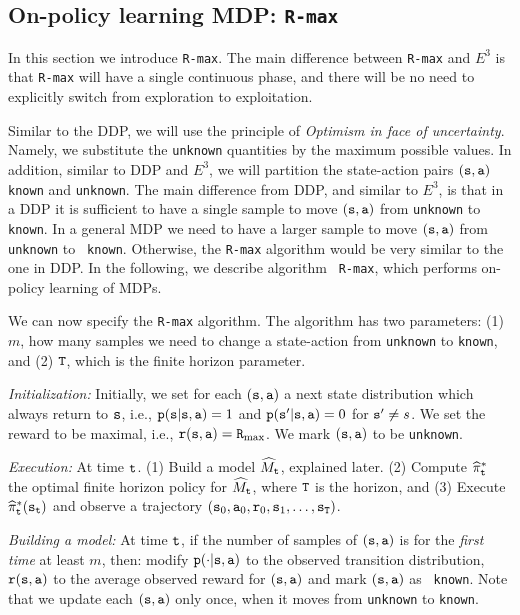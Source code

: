 \subsection{On-policy learning MDP: {\tt R-max}}

In this section we introduce {\tt R-max}. The main difference
between {\tt R-max} and $E^3$ is that {\tt R-max} will have a single
continuous phase, and there will be no need to explicitly switch
from exploration to exploitation.

Similar to the DDP, we will use the principle of {\em Optimism in
face of uncertainty}. Namely, we substitute the \texttt{unknown} quantities
by the maximum possible values.
%
In addition, similar to DDP and $E^3$, we will partition the
state-action pairs $({\tt s},{\tt a})$ \texttt{known} and \texttt{unknown}.
%
The main difference from DDP, and similar to $E^3$, is that in a DDP
it is sufficient to have a single sample to move $({\tt s},{\tt a})$
from \texttt{unknown} to \texttt{known}. In a general MDP we need to have a
larger sample to move $({\tt s},{\tt a})$ from \texttt{unknown} to {\tt
known}. Otherwise, the {\tt R-max} algorithm would be very similar
to the one in DDP. In the following, we describe algorithm {\tt
R-max}, which performs on-policy learning of MDPs.

We can now specify the {\tt R-max} algorithm. The algorithm has two
parameters: (1) $m$, how many samples we need to change a
state-action from \texttt{unknown} to \texttt{known}, and (2) ${\tt T}$, which is
the finite horizon parameter.

{\em Initialization:} Initially, we set for each $({\tt s},{\tt a})$
a next state distribution which always return to ${\tt s}$, i.e.,
${\tt p}({\tt s}|{\tt s},{\tt a})=1$ and ${\tt p}({\tt s}'|{\tt s},{\tt a})=0$ for
${\tt s}'\neq s$. We set the reward to be maximal, i.e.,
${\tt r}({\tt s},{\tt a})={\tt R}_{\max }$. We mark $({\tt s},{\tt a})$ to be
\texttt{unknown}.

{\em Execution:} At time ${\tt t}$. (1) Build a model
$\widehat{M}_{\tt t}$, explained later. (2) Compute
$\widehat{\pi}^*_{\tt t}$ the optimal finite horizon policy for
$\widehat{M}_{\tt t}$, where ${\tt T}$ is the horizon, and (3) Execute
$\widehat{\pi}^*_{\tt t}({\tt s}_{\tt t})$ and
observe a trajectory $({\tt s}_0,{\tt a}_0,{\tt r}_0,{\tt s}_1, \ldots, {\tt s}_{\tt T})$.

{\em Building a model:} At time ${\tt t}$, if the number of samples
of $({\tt s},{\tt a})$ is for the {\em first time} at least $m$,
then: modify ${\tt p}(\cdot|{\tt s},{\tt a})$ to the observed transition
distribution, ${\tt r}({\tt s},{\tt a})$ to the average observed
reward for $({\tt s},{\tt a})$ and mark $({\tt s},{\tt a})$ as {\tt
known}. Note that we update each $({\tt s},{\tt a})$ only once, when
it moves from \texttt{unknown} to \texttt{known}.

